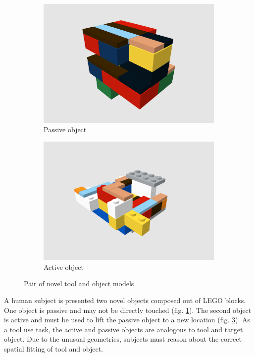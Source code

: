 \documentclass[11]{article}
\begin{document}
\begin{figure}[!h]
  \centering
  \begin{subfigure}{0.49\textwidth}
    \includegraphics[width=1\linewidth]{./figures/obj51.png}
    \caption{Passive object}
    \label{fig:obj51}
  \end{subfigure}
  \begin{subfigure}{0.49\textwidth}
    \includegraphics[width=1\linewidth]{./figures/obj52.png}
    \caption{Active object}
    \label{fig:obj52}
  \end{subfigure}
  \caption{Pair of novel tool and object models}
\end{figure}

A human subject is presented two novel objects composed out of LEGO blocks.
One object is passive and may not be directly touched (fig. \ref{fig:obj51}).
The second object is active and must be used to lift the passive object to a new location (fig. \ref{fig:obj52}).
As a tool use task, the active and passive objects are analogous to tool and target object.
Due to the unusual geometries, subjects must reason about the correct spatial fitting of tool and object.    
\end{document}
